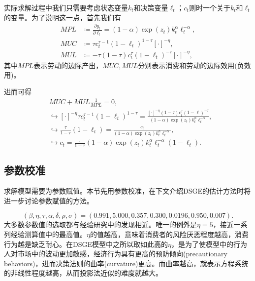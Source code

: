 实际求解过程中我们只需要考虑状态变量$k_{t}$和决策变量$\ell_{t}$；$c_{t}$则时一个关于$k_{t}$和$\ell_{t}$的变量。为了说明这一点，首先我们有
\begin{equation*}
  \begin{split}
    MPL & \coloneqq \frac{\partial y_{t}}{\partial \ell_{t}} = \left( 1 - \alpha \right) \exp \left( z_{t} \right) k_{t}^{\alpha} \ell_{t}^{- \alpha}, \\
    MUC & \coloneqq \tau c_{t}^{\tau - 1} \left( 1 - \ell_{t} \right)^{1 - \tau} \left[ \cdot \right]^{-\eta}, \\
    MUL & \coloneqq - \tau \left( 1 - \tau \right) c_{t}^{\tau} \left( 1 - \ell_{t} \right)^{- \tau} \left[ \cdot \right]^{-\eta},
  \end{split}
\end{equation*}
其中$MPL$表示劳动的边际产出，$MUC, MUL$分别表示消费和劳动的边际效用(负效用)。

进而可得
\begin{equation}
  \label{eq:pj-solution-example-c}
\begin{split}
    & MUC + MUL \frac{1}{MPL} = 0, \\
    & \hookrightarrow
    \left[ \cdot \right]^{-\eta} \tau c_{t}^{\tau - 1} \left( 1 - \ell_{t} \right)^{1 - \tau} =
    \frac{
    \left[ \cdot \right]^{-\eta} \left( 1 - \tau \right) c_{t}^{\tau} \left(1 - \ell \right)^{-\tau}
    }{
    \left(1 - \alpha \right) \exp \left( z_{t} \right) k_{t}^{\alpha} \ell_{t}^{-\alpha}
    }, \\
    & \hookrightarrow
    \frac{\tau}{1 - \tau} \left( 1 - \ell_{t} \right)
    = \frac{
    c_{t}
    }{
    \left( 1- \alpha \right) \exp \left( z_{t} \right) k_{t}^{\alpha} \ell_{t}^{-\alpha}
    }, \\
    & \hookrightarrow
    c_{t} = \frac{\tau}{1-\tau} \left(1 - \alpha \right)
    \exp \left( z_{t} \right) k_{t}^{\alpha} \ell_{t}^{-\alpha} \left( 1 - \ell_{t} \right).
\end{split}
\end{equation}

\subsection{参数校准}
\label{sec:pj-example-calibration}
求解模型需要为参数赋值。本节先用参数校准，在下文介绍DSGE的估计方法时将进一步讨论参数赋值的方法。

\begin{equation*}
  \left(\beta, \eta, \tau, \alpha, \delta, \rho, \sigma \right) = \left( 0.991, 5.000, 0.357, 0.300, 0.0196, 0.950, 0.007 \right).
\end{equation*}
大多数参数值的选取都与经验研究中的发现相近。唯一的例外是$\eta = 5$，接近一系列经验测算值中的最高值。$\eta$的值越高，意味着消费者的风险厌恶程度越高，消费行为越是缺乏耐心。在DSGE模型中之所以取如此高的$\eta$，是为了使模型中的行为人对市场中的波动更加敏感，经济行为具有更高的预防倾向(precautionary behaviors)，进而决策法则的曲率(curvature)更高。而曲率越高，就表示方程系统的非线性程度越高，从而投影法近似的难度就越大。

